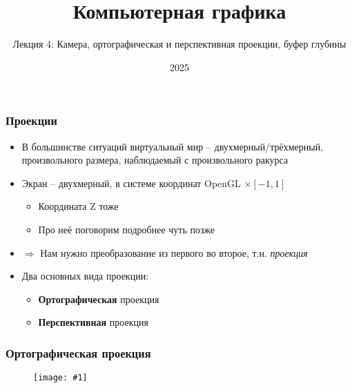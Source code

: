 \documentclass[10pt]{beamer}
\title{Компьютерная графика}
\subtitle{Лекция 4: Камера, ортографическая и перспективная проекции, буфер глубины}
\date{2025}
\newcommand{\slideimage}[1]{
  \begin{figure}
    \begin{adjustbox}{width=\textwidth, totalheight=\textheight-2\baselineskip-2\baselineskip,keepaspectratio}
      \texttt{[image: \#1]}
    \end{adjustbox}
  \end{figure}
}
\begin{document}
\frame{\titlepage}

\begin{frame}[fragile]
\frametitle{Проекции}
\begin{itemize}
\item В большинстве ситуаций виртуальный мир -- двухмерный/трёхмерный, произвольного размера, наблюдаемый с произвольного ракурса
\pause
\item Экран -- двухмерный, в системе координат OpenGL \begin{math}[-1, 1] \times [-1, 1]\end{math}
\pause
\begin{itemize}
\item Координата Z тоже \begin{math}[-1, 1]\end{math}
\item Про неё поговорим подробнее чуть позже
\end{itemize}
\pause
\item \begin{math}\Longrightarrow\end{math} Нам нужно преобразование из первого во второе, т.н. \textit{проекция}
\pause
\item Два основных вида проекции:
\begin{itemize}
\item \textbf{Ортографическая} проекция
\item \textbf{Перспективная} проекция
\end{itemize}
\end{itemize}
\end{frame}

\begin{frame}[fragile]
\frametitle{Ортографическая проекция}
\slideimage{orthographic.png}
\end{frame}
\end{document}

